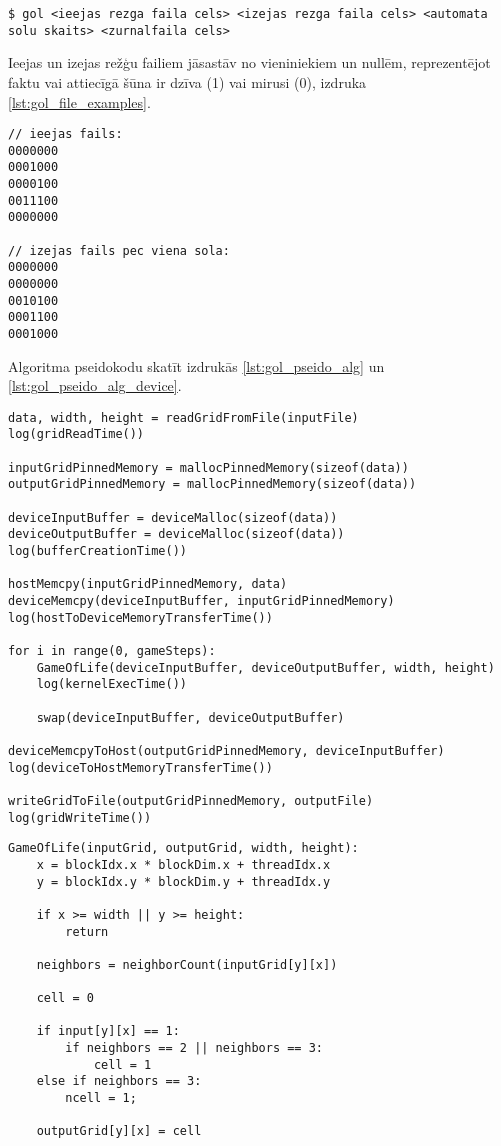 \begin{lstlisting}[caption={Programmas galvenā izpilde},
    captionpos=b,
    label=lst:gol_mains]
$ gol <ieejas rezga faila cels> <izejas rezga faila cels> <automata solu skaits> <zurnalfaila cels> 
\end{lstlisting}

Ieejas un izejas režģu failiem jāsastāv no vieniniekiem un nullēm,
reprezentējot faktu vai attiecīgā šūna ir dzīva (1) vai mirusi (0), izdruka
\ref{lst:gol_file_examples}.

\begin{lstlisting}[caption={Ieejas, izejas faila piemērs (ar tā saukto planiera rakstu)},
    captionpos=b,
    label=lst:gol_file_examples]
// ieejas fails:
0000000
0001000
0000100
0011100
0000000

// izejas fails pec viena sola:
0000000
0000000
0010100
0001100
0001000
\end{lstlisting}

Algoritma pseidokodu skatīt izdrukās \ref{lst:gol_pseido_alg} un  \ref{lst:gol_pseido_alg_device}.
\begin{lstlisting}[caption={Dzīves spēles šūnu automāta CPU puses pseidokods},
    captionpos=b,
    label=lst:gol_pseido_alg]
data, width, height = readGridFromFile(inputFile)
log(gridReadTime())

inputGridPinnedMemory = mallocPinnedMemory(sizeof(data))
outputGridPinnedMemory = mallocPinnedMemory(sizeof(data))

deviceInputBuffer = deviceMalloc(sizeof(data))
deviceOutputBuffer = deviceMalloc(sizeof(data))
log(bufferCreationTime())

hostMemcpy(inputGridPinnedMemory, data)
deviceMemcpy(deviceInputBuffer, inputGridPinnedMemory)
log(hostToDeviceMemoryTransferTime())

for i in range(0, gameSteps):
    GameOfLife(deviceInputBuffer, deviceOutputBuffer, width, height)
    log(kernelExecTime())

    swap(deviceInputBuffer, deviceOutputBuffer)

deviceMemcpyToHost(outputGridPinnedMemory, deviceInputBuffer)
log(deviceToHostMemoryTransferTime())

writeGridToFile(outputGridPinnedMemory, outputFile)
log(gridWriteTime())
\end{lstlisting}

\begin{lstlisting}[caption={Dzīves spēles šūnu automāta GPGPU kodola pseidokods},
    captionpos=b,
    label=lst:gol_pseido_alg_device]
GameOfLife(inputGrid, outputGrid, width, height):
    x = blockIdx.x * blockDim.x + threadIdx.x
    y = blockIdx.y * blockDim.y + threadIdx.y

    if x >= width || y >= height:
        return

    neighbors = neighborCount(inputGrid[y][x])
    
    cell = 0

    if input[y][x] == 1:
		if neighbors == 2 || neighbors == 3:
		    cell = 1
	else if neighbors == 3:
        ncell = 1;

    outputGrid[y][x] = cell
\end{lstlisting}

